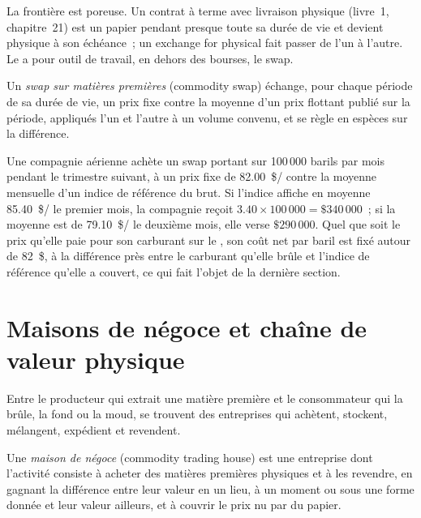 La frontière est poreuse. Un contrat à terme avec livraison physique
(livre~1, chapitre~21) est un papier pendant presque toute sa durée de vie et devient physique
à son échéance~; un exchange for physical fait passer de l'un à l'autre. Le 
a pour outil de travail, en dehors des bourses, le swap.

\begin{definition}\label{def:m3:physical-commodity-markets:swap}
Un \emph{swap sur matières premières} (commodity swap) échange, pour chaque période de sa
durée de vie, un prix fixe contre la moyenne d'un prix flottant publié sur la période,
appliqués l'un et l'autre à un volume convenu, et se règle en espèces sur la différence.
\end{definition}

\begin{example}\label{ex:m3:physical-commodity-markets:swap}
Une compagnie aérienne achète un swap portant sur 100\,000 barils par mois pendant le trimestre suivant, à un prix fixe de
\qty{82.00}{\$/\barrel} contre la moyenne mensuelle d'un indice de référence du brut. Si
l'indice affiche en moyenne \qty{85.40}{\$/\barrel} le premier mois, la compagnie
reçoit $3.40 \times 100\,000 = \$340\,000$~; si la moyenne est de \qty{79.10}{\$/\barrel}
le deuxième mois, elle verse $\$290\,000$. Quel que soit le prix qu'elle paie pour son carburant sur le
, son coût net par baril est fixé autour de 82~\$, à la différence près
entre le carburant qu'elle brûle et l'indice de référence qu'elle a couvert, ce qui fait l'objet de
la dernière section.
\end{example}

\section{Maisons de négoce et chaîne de valeur physique}

Entre le producteur qui extrait une matière première et le consommateur qui la brûle, la fond
ou la moud, se trouvent des entreprises qui achètent, stockent, mélangent, expédient et revendent.

\begin{definition}\label{def:m3:physical-commodity-markets:house}
Une \emph{maison de négoce} (commodity trading house) est une entreprise dont
l'activité consiste à acheter des matières premières physiques et à les revendre, en gagnant la différence
entre leur valeur en un lieu, à un moment ou sous une forme donnée et leur valeur ailleurs, et
à couvrir le prix nu par du papier.
\end{definition}

